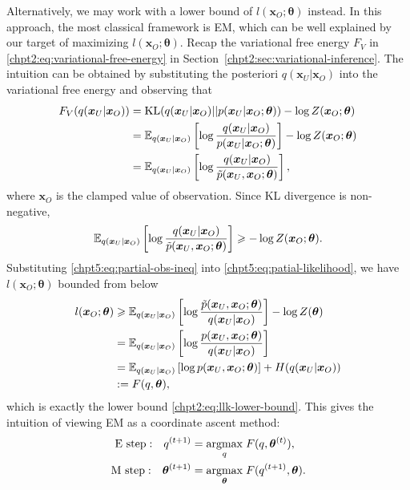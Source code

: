Alternatively, we may work with a lower bound of $l(\bm{x}_O; \bm{\theta})$ instead. In this approach, the most classical framework is EM, which can be well explained by our target of maximizing $l(\bm{x}_O; \bm{\theta})$. Recap the variational free energy $F_V$ in \eqref{chpt2:eq:variational-free-energy} in Section~\ref{chpt2:sec:variational-inference}. The intuition can be obtained by substituting the posteriori $q(\bm{x}_U|\bm{x}_O)$ into the variational free energy and observing that
\begin{align}
  F_V(q(\bm{x}_U|\bm{x}_O)) & = \mathrm{KL}(q(\bm{x}_U|\bm{x}_O) || p(\bm{x}_U|\bm{x}_O; \bm{\theta})) - \log{Z(\bm{x}_O; \bm{\theta})} \nonumber \\
                            &= \mathbb{E}_{q(\bm{x}_U|\bm{x}_O)}\left[  \log{\frac{q(\bm{x}_U|\bm{x}_O)}{{p}(\bm{x}_U| \bm{x}_O; \bm{\theta})}} \right] - \log{Z(\bm{x}_O;\bm{\theta})} \nonumber \\
                            &= \mathbb{E}_{q(\bm{x}_U|\bm{x}_O)}\left[ \log{\frac{q(\bm{x}_U|\bm{x}_O)}{\tilde{p}(\bm{x}_U, \bm{x}_O; \bm{\theta})}} \right],
\end{align}
where $\bm{x}_O$ is the clamped value of observation. Since KL divergence is non-negative,
\begin{equation}\label{chpt5:eq:partial-obs-ineq}
  \mathbb{E}_{q(\bm{x}_U|\bm{x}_O)}\left[ \log{\frac{q(\bm{x}_U|\bm{x}_O)}{\tilde{p}(\bm{x}_U, \bm{x}_O; \bm{\theta})}} \right] \geqslant - \log{Z(\bm{x}_O; \bm{\theta})}.
\end{equation}
Substituting \eqref{chpt5:eq:partial-obs-ineq} into \eqref{chpt5:eq:patial-likelihood}, we have $l(\bm{x}_O; \bm{\theta})$ bounded from below
\begin{align}\label{chpt5:eq:lower-bound-F}
  l(\bm{x}_O; \bm{\theta}) &\geqslant \mathbb{E}_{q(\bm{x}_U|\bm{x}_O)}\left[ \log{\frac{\tilde{p}(\bm{x}_U, \bm{x}_O; \bm{\theta})}{q(\bm{x}_U|\bm{x}_O)}} \right] - \log{Z(\bm{\theta})} \nonumber \\
                           & = \mathbb{E}_{q(\bm{x}_U|\bm{x}_O)}\left[ \log{\frac{{p}(\bm{x}_U, \bm{x}_O; \bm{\theta})}{q(\bm{x}_U|\bm{x}_O)}} \right] \nonumber \\
                           & = \mathbb{E}_{q(\bm{x}_U|\bm{x}_O)}\left[ \log{{p}(\bm{x}_U, \bm{x}_O; \bm{\theta})} \right] + H({q(\bm{x}_U|\bm{x}_O)}) \nonumber \\
                           & := F(q, \bm{\theta}),
\end{align}
which is exactly the lower bound \eqref{chpt2:eq:llk-lower-bound}. This gives the intuition of viewing EM as a coordinate ascent method:
\begin{align}
  \mathrm{E~step:}~~~ q^{(t+1)} &= \underset{q}{\operatorname{argmax}}\;{F(q, \bm{\theta}^{(t)})}, \\
  \mathrm{M~step:}~~~\bm{\theta}^{(t+1)} &= \underset{\bm{\theta}}{\operatorname{argmax}}\;{F(q^{(t+1)}, \bm{\theta})}.
\end{align}

